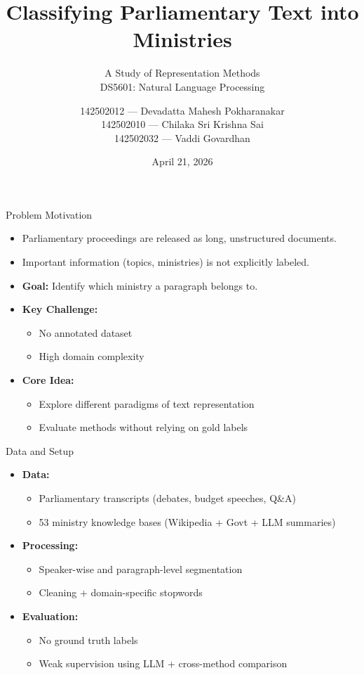 \documentclass{beamer}
\title{Classifying Parliamentary Text into Ministries}
\subtitle{A Study of Representation Methods \\ [1em] DS5601: Natural Language Processing}
\author{142502012 --- Devadatta Mahesh Pokharanakar \\ 142502010 --- Chilaka Sri Krishna Sai \\ 142502032 --- Vaddi Govardhan}
\institute{Department of Data Science \\ IIT Palakkad}
\date{April 21, 2026}
\begin{document}
\maketitle

\begin{frame}{Problem Motivation}
\begin{itemize}
    \item Parliamentary proceedings are released as long, unstructured documents.
    \item Important information (topics, ministries) is not explicitly labeled.
    
    \item \textbf{Goal:} Identify which ministry a paragraph belongs to.
    
    \item \textbf{Key Challenge:}
    \begin{itemize}
        \item No annotated dataset
        \item High domain complexity
    \end{itemize}
    
    \item \textbf{Core Idea:} 
    \begin{itemize}
        \item Explore different paradigms of text representation
        \item Evaluate methods without relying on gold labels
    \end{itemize}
\end{itemize}
\end{frame}

\begin{frame}{Data and Setup}
\begin{itemize}
    \item \textbf{Data:}
    \begin{itemize}
        \item Parliamentary transcripts (debates, budget speeches, Q\&A)
        \item 53 ministry knowledge bases (Wikipedia + Govt + LLM summaries)
    \end{itemize}
    
    \item \textbf{Processing:}
    \begin{itemize}
        \item Speaker-wise and paragraph-level segmentation
        \item Cleaning + domain-specific stopwords
    \end{itemize}
    
    \item \textbf{Evaluation:}
    \begin{itemize}
        \item No ground truth labels
        \item Weak supervision using LLM + cross-method comparison
    \end{itemize}
\end{itemize}
\end{frame}
\end{document}
